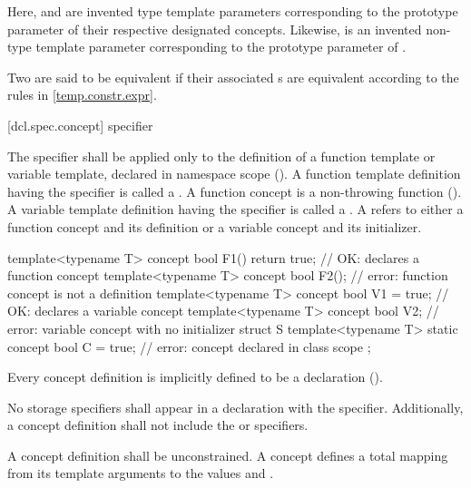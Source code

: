Here,  and  are invented type template 
parameters corresponding to the
prototype parameter of their respective designated concepts.
Likewise,  is an invented non-type template parameter
corresponding to the prototype parameter of .

\pnum
Two 
are said to be equivalent if their associated
s are
equivalent according to the rules in 
\ref{temp.constr.expr}.



[dcl.spec.concept]{ specifier}

\pnum
The  specifier shall be applied only to the 
definition of a function template or variable template, declared
in namespace scope ().
% 
A function template definition having the 
specifier is called a . A function
concept is a non-throwing function 
().
% 
A variable template definition having the  
specifier is called a .
% 
A  refers to either a function concept 
and its definition or a variable concept and its initializer.
% 
\enterexample
\begin{codeblock}
template<typename T> 
  concept bool F1() { return true; } // OK: declares a function concept
template<typename T> 
  concept bool F2();                 // error: function concept is not a definition
template<typename T> 
  concept bool V1 = true;            // OK: declares a variable concept
template<typename T> 
  concept bool V2;                   // error: variable concept with no initializer
struct S {
  template<typename T> 
    static concept bool C = true;    // error: concept declared in class scope
};
\end{codeblock}
\exitexample

\pnum
Every concept definition is implicitly defined to be a 
 declaration 
(). 

\pnum
No storage specifiers shall appear in a declaration with the 
 specifier. Additionally, a concept definition
shall not include the  or 
specifiers. 

\pnum
A concept definition shall be unconstrained.
\enternote
A concept defines a total mapping from its template arguments to the 
values  and .
\exitnote

